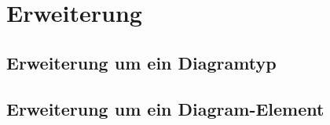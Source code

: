 
\section{Erweiterung}

\subsection{Erweiterung um ein Diagramtyp}
\subsection{Erweiterung um ein Diagram-Element}